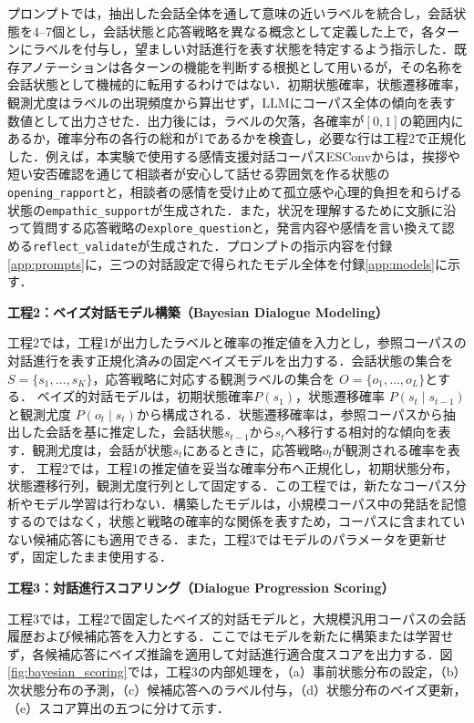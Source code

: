 \documentclass[manuscript,review,anonymous]{acmart}
\begin{document}
プロンプトでは，抽出した会話全体を通して意味の近いラベルを統合し，会話状態を4--7個とし，会話状態と応答戦略を異なる概念として定義した上で，各ターンにラベルを付与し，望ましい対話進行を表す状態を特定するよう指示した．既存アノテーションは各ターンの機能を判断する根拠として用いるが，その名称を会話状態として機械的に転用するわけではない．初期状態確率，状態遷移確率，観測尤度はラベルの出現頻度から算出せず，LLMにコーパス全体の傾向を表す数値として出力させた．出力後には，ラベルの欠落，各確率が$[0,1]$の範囲内にあるか，確率分布の各行の総和が1であるかを検査し，必要な行は工程2で正規化した．例えば，本実験で使用する感情支援対話コーパスESConv\cite{liu2021esconv}からは，挨拶や短い安否確認を通じて相談者が安心して話せる雰囲気を作る状態の\texttt{opening\_\allowbreak rapport}と，相談者の感情を受け止めて孤立感や心理的負担を和らげる状態の\texttt{empathic\_\allowbreak support}が生成された．また，状況を理解するために文脈に沿って質問する応答戦略の\texttt{explore\_\allowbreak question}と，発言内容や感情を言い換えて認める\texttt{reflect\_\allowbreak validate}が生成された．プロンプトの指示内容を付録\ref{app:prompts}に，三つの対話設定で得られたモデル全体を付録\ref{app:models}に示す．

\label{mod:bayesian_modeling}
\noindent\textbf{工程2：ベイズ対話モデル構築（Bayesian Dialogue Modeling）}\par

工程2では，工程1が出力したラベルと確率の推定値を入力とし，参照コーパスの対話進行を表す正規化済みの固定ベイズモデルを出力する．会話状態の集合を
$S=\{s_1,\ldots,s_K\}$，応答戦略に対応する観測ラベルの集合を
$O=\{o_1,\ldots,o_L\}$とする．
ベイズ的対話モデルは，初期状態確率$P(s_1)$，状態遷移確率
$P(s_t\mid s_{t-1})$と観測尤度
$P(o_t\mid s_t)$から構成される．状態遷移確率は，参照コーパスから抽出した会話を基に推定した，会話状態$s_{t-1}$から$s_t$へ移行する相対的な傾向を表す．観測尤度は，会話が状態$s_t$にあるときに，応答戦略$o_t$が観測される確率を表す．
工程2では，工程1の推定値を妥当な確率分布へ正規化し，初期状態分布，状態遷移行列，観測尤度行列として固定する．この工程では，新たなコーパス分析やモデル学習は行わない．構築したモデルは，小規模コーパス中の発話を記憶するのではなく，状態と戦略の確率的な関係を表すため，コーパスに含まれていない候補応答にも適用できる．また，工程3ではモデルのパラメータを更新せず，固定したまま使用する．

\label{mod:scoring}
\noindent\textbf{工程3：対話進行スコアリング（Dialogue Progression Scoring）}\par

工程3では，工程2で固定したベイズ的対話モデルと，大規模汎用コーパスの会話履歴および候補応答を入力とする．ここではモデルを新たに構築または学習せず，各候補応答にベイズ推論を適用して対話進行適合度スコアを出力する．図\ref{fig:bayesian_scoring}では，工程3の内部処理を，（a）事前状態分布の設定，（b）次状態分布の予測，（c）候補応答へのラベル付与，（d）状態分布のベイズ更新，（e）スコア算出の五つに分けて示す．
\end{document}

